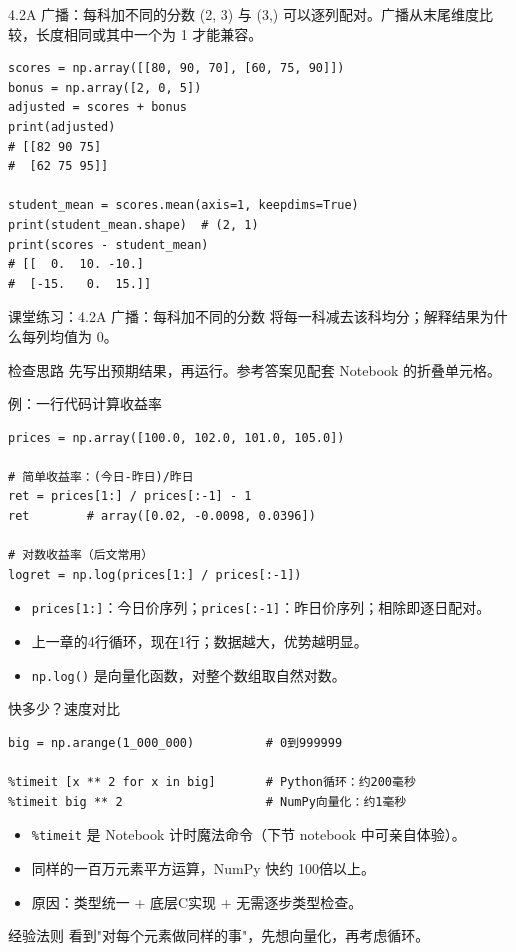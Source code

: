 \documentclass[9pt]{ctexbeamer}
\begin{document}
\begin{frame}[fragile]{4.2A 广播：每科加不同的分数}
\small (2, 3) 与 (3,) 可以逐列配对。广播从末尾维度比较，长度相同或其中一个为 1 才能兼容。
\medskip
\begin{lstlisting}
scores = np.array([[80, 90, 70], [60, 75, 90]])
bonus = np.array([2, 0, 5])
adjusted = scores + bonus
print(adjusted)
# [[82 90 75]
#  [62 75 95]]

student_mean = scores.mean(axis=1, keepdims=True)
print(student_mean.shape)  # (2, 1)
print(scores - student_mean)
# [[  0.  10. -10.]
#  [-15.   0.  15.]]
\end{lstlisting}
\end{frame}
\begin{frame}[fragile]{课堂练习：4.2A 广播：每科加不同的分数}
将每一科减去该科均分；解释结果为什么每列均值为 0。
\medskip
\begin{block}{检查思路}
先写出预期结果，再运行。参考答案见配套 Notebook 的折叠单元格。
\end{block}
\end{frame}

\begin{frame}[fragile]{例：一行代码计算收益率}
	\begin{lstlisting}
prices = np.array([100.0, 102.0, 101.0, 105.0])

# 简单收益率：(今日-昨日)/昨日
ret = prices[1:] / prices[:-1] - 1
ret        # array([0.02, -0.0098, 0.0396])

# 对数收益率（后文常用）
logret = np.log(prices[1:] / prices[:-1])
\end{lstlisting}
	\begin{itemize}
		\item \texttt{prices[1:]}：今日价序列；\texttt{prices[:-1]}：昨日价序列；相除即逐日配对。
		\item 上一章的4行循环，现在\alert{1行}；数据越大，优势越明显。
		\item \texttt{np.log()} 是向量化函数，对整个数组取自然对数。
	\end{itemize}
\end{frame}

\begin{frame}[fragile]{快多少？速度对比}
	\begin{lstlisting}
big = np.arange(1_000_000)          # 0到999999

%timeit [x ** 2 for x in big]       # Python循环：约200毫秒
%timeit big ** 2                    # NumPy向量化：约1毫秒
\end{lstlisting}
	\begin{itemize}
		\item \texttt{\%timeit} 是 Notebook 计时魔法命令（下节 notebook 中可亲自体验）。
		\item 同样的一百万元素平方运算，NumPy 快约 \alert{100倍以上}。
		\item 原因：类型统一 + 底层C实现 + 无需逐步类型检查。
	\end{itemize}
	\begin{block}{经验法则}
		看到"对每个元素做同样的事"，先想向量化，再考虑循环。
	\end{block}
\end{frame}
\end{document}
